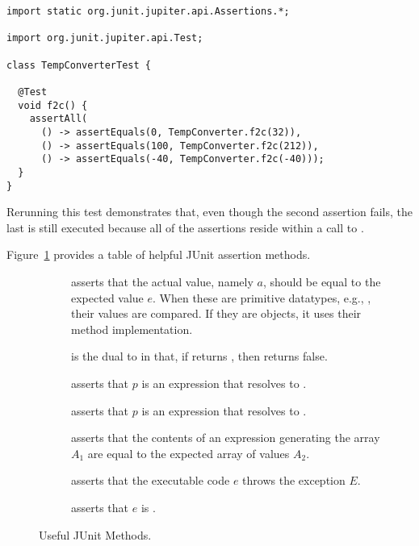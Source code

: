 \begin{cl}[]{}
\begin{lstlisting}[language=MyJava]
import static org.junit.jupiter.api.Assertions.*;

import org.junit.jupiter.api.Test;
  
class TempConverterTest {

  @Test
  void f2c() {
    assertAll(
      () -> assertEquals(0, TempConverter.f2c(32)),
      () -> assertEquals(100, TempConverter.f2c(212)),
      () -> assertEquals(-40, TempConverter.f2c(-40)));
  }
}
\end{lstlisting}
\end{cl}
Rerunning this test demonstrates that, even though the second assertion fails, the last is still executed because all of the assertions reside within a call to . 

Figure~\ref{fig:testingmethods} provides a table of helpful JUnit assertion methods.

\begin{figure}[tp]
    \small
    \begin{tcolorbox}[title=JUnit 5 Testing Methods]
    \begin{description}
      \item [] asserts that the actual value, namely $a$, should be equal to the expected value $e$. When these are primitive datatypes, e.g., , their values are compared. If they are objects, it uses their  method implementation.
      \item [] is the dual to  in that, if  returns , then  returns false.
      \item [] asserts that $p$ is an expression that resolves to .
      \item [] asserts that $p$ is an expression that resolves to .
      \item [] asserts that the contents of an expression generating the array $A_1$ are equal to the expected array of values $A_2$. 
      \item [] asserts that the executable code $e$ throws the exception $E$.
      \item [] asserts that $e$ is .
    \end{description}
  \end{tcolorbox}
    \caption{Useful JUnit Methods.}
    \label{fig:testingmethods}
  \end{figure}
